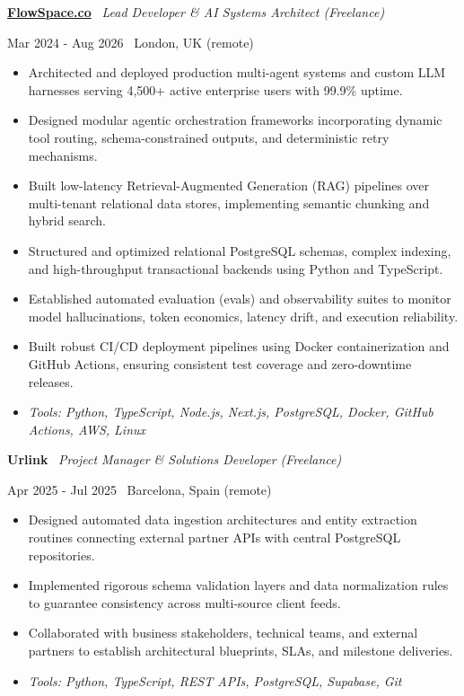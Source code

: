\documentclass[a4paper,10pt]{article}
\newcommand{\role}[4]{%
  \vspace{2pt}\noindent
  \begin{minipage}[t]{0.70\textwidth}\raggedright\textbf{#1} \textbullet\ \textit{#3}\end{minipage}%
  \hfill
  \begin{minipage}[t]{0.28\textwidth}\raggedleft\footnotesize\color{gray}#2 \textbullet\ #4\end{minipage}%
  \vspace{1pt}%
}
\begin{document}
\role{\href{https://flowspace.co}{FlowSpace.co}}{Mar 2024 - Aug 2026}{Lead Developer \& AI Systems Architect (Freelance)}{London, UK (remote)}
\begin{itemize}
  \item Architected and deployed production multi-agent systems and custom LLM harnesses serving 4,500+ active enterprise users with 99.9\% uptime.
  \item Designed modular agentic orchestration frameworks incorporating dynamic tool routing, schema-constrained outputs, and deterministic retry mechanisms.
  \item Built low-latency Retrieval-Augmented Generation (RAG) pipelines over multi-tenant relational data stores, implementing semantic chunking and hybrid search.
  \item Structured and optimized relational PostgreSQL schemas, complex indexing, and high-throughput transactional backends using Python and TypeScript.
  \item Established automated evaluation (evals) and observability suites to monitor model hallucinations, token economics, latency drift, and execution reliability.
  \item Built robust CI/CD deployment pipelines using Docker containerization and GitHub Actions, ensuring consistent test coverage and zero-downtime releases.
  \item \textit{Tools: Python, TypeScript, Node.js, Next.js, PostgreSQL, Docker, GitHub Actions, AWS, Linux}
\end{itemize}

\role{Urlink}{Apr 2025 - Jul 2025}{Project Manager \& Solutions Developer (Freelance)}{Barcelona, Spain (remote)}
\begin{itemize}
  \item Designed automated data ingestion architectures and entity extraction routines connecting external partner APIs with central PostgreSQL repositories.
  \item Implemented rigorous schema validation layers and data normalization rules to guarantee consistency across multi-source client feeds.
  \item Collaborated with business stakeholders, technical teams, and external partners to establish architectural blueprints, SLAs, and milestone deliveries.
  \item \textit{Tools: Python, TypeScript, REST APIs, PostgreSQL, Supabase, Git}
\end{itemize}
\end{document}
